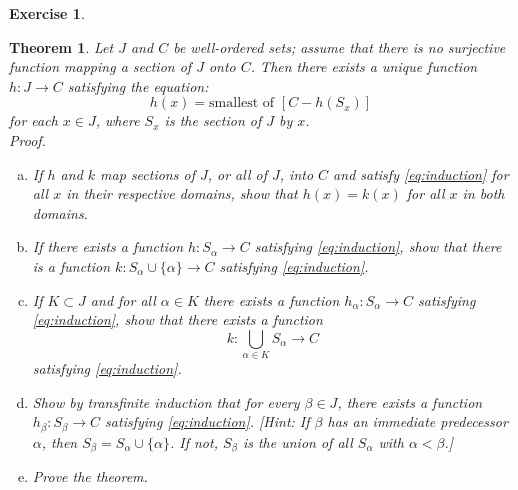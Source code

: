 \documentclass[11pt,a4paper,twoside]{article}
\theoremstyle{definition}
\newcounter{excounter}
\newtheorem{exercise}[excounter]{Exercise}
\theoremstyle{plain}
\newtheorem*{theorem}{Theorem}
\begin{document}
\begin{exercise}

  \begin{theorem}

    Let $J$ and $C$ be well-ordered sets; assume that there is no surjective function
    mapping a section of $J$ onto $C$. Then there exists a unique function $h : J \to C$
    satisfying the equation:
    \begin{equation} \label{eq:induction}
      h ( x ) = \text{smallest of } [ C - h ( S_x ) ]
    \end{equation}
    for each $x \in J$, where $S_x$ is the section of $J$ by $x$. \\
    \emph{Proof.}
    \begin{enumerate}[(a)]

    \item If $h$ and $k$ map sections of $J$, or all of $J$, into $C$ and satisfy \eqref{eq:induction}
      for all $x$ in their respective domains, show that $h ( x ) = k ( x )$ for all $x$ in both domains.

    \item If there exists a function $h : S_\alpha \to C$ satisfying \eqref{eq:induction}, show that there is a function
      $k : S_\alpha \cup \{ \alpha \} \to C$ satisfying \eqref{eq:induction}.

    \item If $K \subset J$ and for all $\alpha \in K$ there exists a function $h_\alpha : S_\alpha \to C$ satisfying \eqref{eq:induction},
      show that there exists a function
      \begin{equation*}
        k : \bigcup_{\alpha \in K} S_\alpha \to C
      \end{equation*}
      satisfying \eqref{eq:induction}.

    \item Show by transfinite induction that for every $\beta \in J$, there exists a function $h_\beta : S_\beta \to C$ satisfying \eqref{eq:induction}.
      [\emph{Hint:} If $\beta$ has an immediate predecessor $\alpha$, then $S_\beta = S_\alpha \cup \{ \alpha \}$. If not, $S_\beta$ is the union
      of all $S_\alpha$ with $\alpha < \beta$.]

    \item Prove the theorem.

    \end{enumerate}

  \end{theorem}

\end{exercise}
\end{document}
